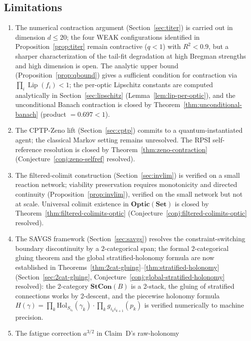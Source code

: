 \documentclass[11pt,a4paper]{article}
\theoremstyle{plain}
\theoremstyle{definition}
\theoremstyle{remark}
\newcommand{\Optic}{\mathbf{Optic}}
\DeclareMathOperator{\Lip}{Lip}
\begin{document}
\subsection{Limitations}

\begin{enumerate}[leftmargin=*,itemsep=2pt]
\item The numerical contraction argument
(Section~\ref{sec:titer}) is carried out in dimension $d\leq 20$; the
four WEAK configurations identified in Proposition~\ref{prop:titer}
remain contractive ($q<1$) with $R^2 < 0.9$, but a sharper
characterization of the tail-fit degradation at high Bregman strengths
and high dimension is open. The analytic upper bound
(Proposition~\ref{prop:qbound}) gives a sufficient condition for
contraction via $\prod_i \Lip(f_i) < 1$; the per-optic Lipschitz
constants are computed analytically in
Section~\ref{sec:lipschitz} (Lemma~\ref{lem:lip-per-optic}), and the
unconditional Banach contraction is closed by
Theorem~\ref{thm:unconditional-banach} (product $= 0.697 < 1$).
\item The CPTP-Zeno lift (Section~\ref{sec:cptp}) commits to a
quantum-instantiated agent; the classical Markov setting remains
unresolved. The RPSI self-reference resolution is closed by
Theorem~\ref{thm:zeno-contraction} (Conjecture~\ref{conj:zeno-selfref}
resolved).
\item The filtered-colimit construction (Section~\ref{sec:invlim}) is
verified on a small reaction network; viability preservation requires
monotonicity and directed continuity (Proposition~\ref{prop:invlim}),
verified on the small network but not at scale. Universal colimit
existence in $\Optic(\mathbf{Set})$ is closed by
Theorem~\ref{thm:filtered-colimits-optic}
(Conjecture~\ref{conj:filtered-colimits-optic} resolved).
\item The SAVGS framework (Section~\ref{sec:savgs}) resolves the
constraint-switching boundary discontinuity by a $2$-categorical span;
the formal $2$-categorical gluing theorem and the global
stratified-holonomy formula are now established in
Theorems~\ref{thm:2cat-gluing}--\ref{thm:stratified-holonomy}
(Section~\ref{sec:2cat-gluing}, Conjecture~\ref{conj:global-stratified-holonomy}
resolved): the 2-category $\mathbf{StCon}(B)$ is a 2-stack, the gluing
of stratified connections works by 2-descent, and the piecewise
holonomy formula $H(\gamma) = \prod_k \mathrm{Hol}_{S_{i_k}}(\gamma_k)
\cdot \prod_k g_{i_k i_{k+1}}(p_k)$ is verified numerically to machine
precision.
\item The fatigue correction $a^{3/2}$ in Claim~D's raw-holonomy

\end{enumerate}
\end{document}
